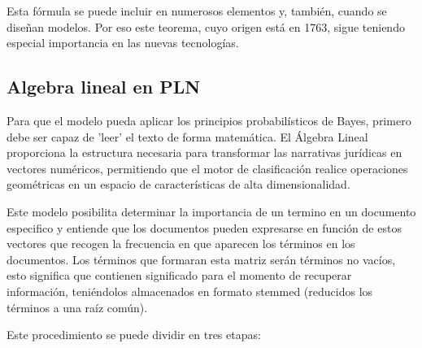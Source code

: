 Esta fórmula se puede incluir en numerosos elementos y, también, cuando se diseñan modelos. Por eso este teorema, cuyo origen está en 1763, sigue teniendo especial importancia en las nuevas tecnologías.

\subsection{Algebra lineal en PLN}

Para que el modelo pueda aplicar los principios probabilísticos de Bayes, primero debe ser capaz de 'leer' el texto de forma matemática. El Álgebra Lineal proporciona la estructura necesaria para transformar las narrativas jurídicas en vectores numéricos, permitiendo que el motor de clasificación realice operaciones geométricas en un espacio de características de alta dimensionalidad.

Este modelo posibilita determinar la importancia de un termino en un documento especifico y entiende que los documentos pueden expresarse en función de estos vectores que recogen la frecuencia en que aparecen los términos en los documentos. Los términos que formaran esta matriz serán términos no vacíos, esto significa que contienen significado para el momento de recuperar información, teniéndolos almacenados en formato stemmed (reducidos los términos a una raíz común).

Este procedimiento se puede dividir en tres etapas:

